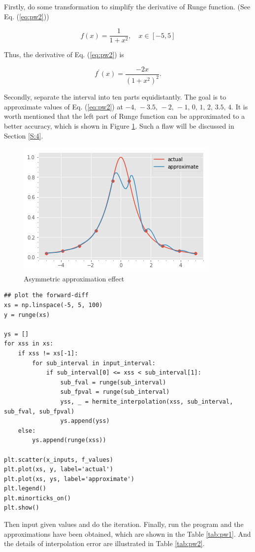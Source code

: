 \documentclass[preprint,12pt]{elsarticle}
\begin{document}
Firstly, do some transformation to simplify the derivative of Runge function. (See Eq. (\ref{eq:pw2}))

\begin{equation}
\label{eq:pw2}
    f(x)=\frac{1}{1+x^2}, \quad x\in[-5,5]
\end{equation}

Thus, the derivative of Eq. (\ref{eq:pw2}) is 

\begin{equation}
\label{eq:pw3}
    f^{'}(x)=\frac{-2x}{(1+x^2)^2}.
\end{equation}

Secondly, separate the interval into ten parts equidistantly. The goal is to approximate values of Eq. (\ref{eq:pw2}) at $-4,\,-3.5,\,-2,\,-1,\,0,\,1,\,2,\,3.5,\,4$. It is worth mentioned that the left part of Runge function can be approximated to a better accuracy, which is shown in Figure \ref{fig:pw2}. Such a flaw will be discussed in Section \ref{S:4}.

\begin{figure}[h]
\centering\includegraphics[width=0.4\linewidth]{runge_function.png}
\caption{Asymmetric approximation effect}
\label{fig:pw2}
\end{figure}

\begin{lstlisting}
## plot the forward-diff
xs = np.linspace(-5, 5, 100)
y = runge(xs)

ys = []
for xss in xs:
    if xss != xs[-1]:
        for sub_interval in input_interval:
            if sub_interval[0] <= xss < sub_interval[1]:
                sub_fval = runge(sub_interval)
                sub_fpval = runge(sub_interval)
                yss, _ = hermite_interpolation(xss, sub_interval, sub_fval, sub_fpval)
                ys.append(yss)
    else:
        ys.append(runge(xss))

plt.scatter(x_inputs, f_values)
plt.plot(xs, y, label='actual')
plt.plot(xs, ys, label='approximate')
plt.legend()
plt.minorticks_on()
plt.show()
\end{lstlisting}

Then input given values and do the iteration. Finally, run the program and the approximations have been obtained, which are shown in the Table \ref{tab:pw1}. And the details of interpolation error are illustrated in Table \ref{tab:pw2}.
\end{document}
